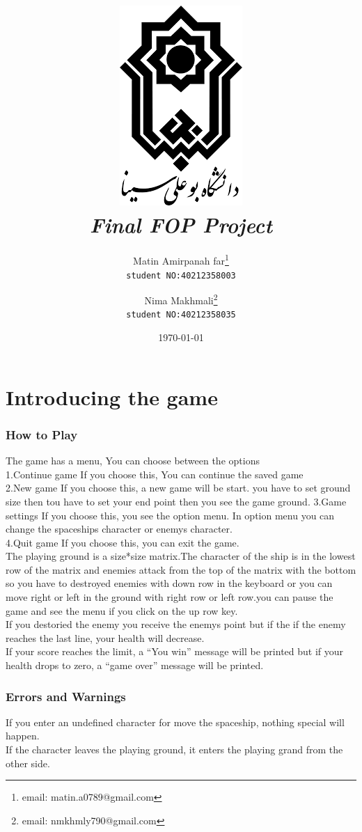 \documentclass[12pt,a4paper]{article}
\title{\includegraphics[scale=0.5]{Graphics/BASU_Logo_header.png}\\[20pt] {\Huge \emph{Final FOP Project}}}
\author{Matin Amirpanah far\thanks{email: matin.a0789@gmail.com}\\
	\texttt{student NO:40212358003}\and
	Nima Makhmali\thanks{email: nmkhmly790@gmail.com}\\ \texttt{student NO:40212358035}}
\date{\today}
\begin{document}
	
	\maketitle
	
	\newpage
	\tableofcontents
	
	\newpage
	\setcounter{section}{0}
	\part{Introducing the game}\label{introducing}

	\section{How to Play}\label{introducing.how}
	The game has a menu, You can choose between the options\\
	1.Continue game
	If you choose this, You can continue the saved game\\
	2.New game
	If you choose this, a new game will be start. you have to set ground size then tou have to set your end point
	then you see the game ground.
	3.Game settings
	If you choose this, you see the option menu. In option menu you can change the spaceships character or enemys character.\\
	4.Quit game
	If you choose this, you can exit the game.\\

	The playing ground is a size*size matrix.The character of the ship is in the lowest row of the matrix and enemies attack from the top of the matrix with the bottom so you have to destroyed enemies with down row in the keyboard or you can move right or left in the ground with right row or left row.you can pause the game and see the menu if you click on the up row key.\\

	If you destoried the enemy you receive the enemys point but if the if the enemy reaches the last line, your health will decrease.\\

	If your score reaches the limit, a ``You win'' message will be printed but if  your health drops to zero, a ``game over'' message will be printed.
 
	\section{Errors and Warnings}\label{introducing.errors}
	If you enter an undefined character for move the spaceship, nothing special will happen.\\
	If the character leaves the playing ground, it enters the playing grand from the other side.\\
	
\end{document}

